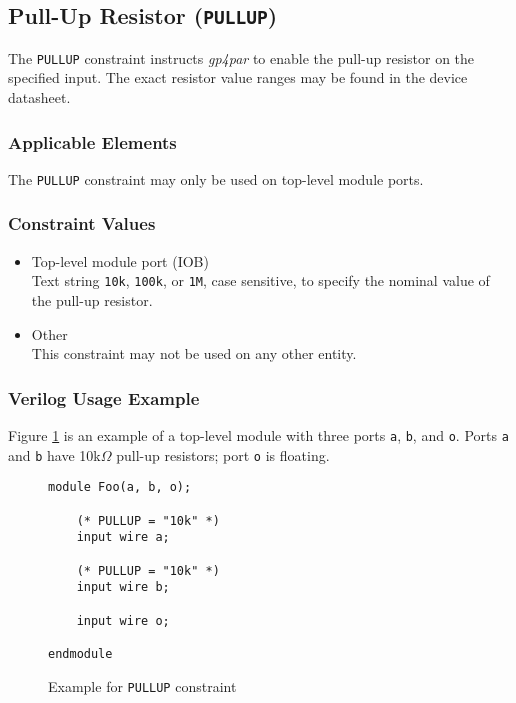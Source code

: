 \documentclass[11pt]{article}
\newcommand{\namestyle}[1]{\textit{#1}}
\newcommand{\tokenstyle}[1]{\texttt{#1}}
\newcommand{\wirestyle}[1]{\texttt{#1}}
\newcommand{\valuestyle}[1]{\texttt{#1}}
\newcommand{\strvaluestyle}[1]{\valuestyle{\textquotedbl#1\textquotedbl}}
\newcommand{\whenstyle}[1]{{\fontseries{sb}\selectfont#1}}
\begin{document}

\pagebreak
\subsection{Pull-Up Resistor (\tokenstyle{PULLUP})}

The \tokenstyle{PULLUP} constraint instructs \namestyle{gp4par} to enable the pull-up resistor on the specified input. The exact resistor
value ranges may be found in the device datasheet.

\subsubsection{Applicable Elements}
The \tokenstyle{PULLUP} constraint may only be used on top-level module ports.

\subsubsection{Constraint Values}
\begin{itemize}
\item \whenstyle{Top-level module port (IOB)}\\
Text string \strvaluestyle{10k}, \strvaluestyle{100k}, or \strvaluestyle{1M}, case sensitive, to specify the nominal value of the pull-up resistor.
\item \whenstyle{Other} \\
This constraint may not be used on any other entity.
\end{itemize}

\subsubsection{Verilog Usage Example}

Figure \ref{constraint-pullup} is an example of a top-level module with three ports \wirestyle{a}, \wirestyle{b}, and
\wirestyle{o}. Ports \wirestyle{a} and \wirestyle{b} have 10k$\Omega$ pull-up resistors; port \wirestyle{o} is floating.

\begin{figure}[h]
\begin{lstlisting}
module Foo(a, b, o);

	(* PULLUP = "10k" *)
	input wire a;

	(* PULLUP = "10k" *)
	input wire b;

	input wire o;

endmodule
\end{lstlisting}
\caption{Example for \tokenstyle{PULLUP} constraint}
\label{constraint-pullup}
\end{figure}
\end{document}

